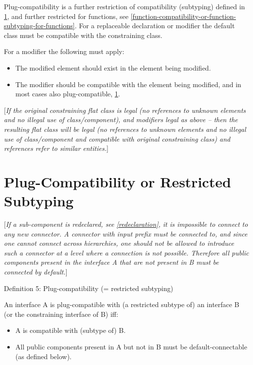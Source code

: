 \documentclass[10pt,a4paper]{report}
\def\doublelabel#1{\label{#1}\hypertarget{#1}{}}
\begin{document}
Plug-compatibility is a further restriction of compatibility (subtyping)
defined in \ref{plug-compatibility-or-restricted-subtyping}, and further restricted for functions, see
\ref{function-compatibility-or-function-subtyping-for-functions}. For a replaceable declaration or modifier the default class
must be compatible with the constraining class.

For a modifier the following must apply:

\begin{itemize}
\item
  The modified element should exist in the element being modified.
\end{itemize}

\begin{itemize}
\item
  The modifier should be compatible with the element being modified, and
  in most cases also plug-compatible, \ref{plug-compatibility-or-restricted-subtyping}.
\end{itemize}

{[}\emph{If the original constraining flat class is legal (no references
to unknown elements and no illegal use of class/component), and
modifiers legal as above -- then the resulting flat class will be legal
(no references to unknown elements and no illegal use of class/component
and compatible with original constraining class) and references refer to
similar entities.}{]}

\section{Plug-Compatibility or Restricted Subtyping}\doublelabel{plug-compatibility-or-restricted-subtyping}

{[}\emph{If a sub-component is redeclared, see \ref{redeclaration}, it is
impossible to connect to any new connector. A connector with input
prefix must be connected to, and since one cannot connect across
hierarchies, one should not be allowed to introduce such a connector at
a level where a connection is not possible. Therefore all public
components present in the interface A that are not present in B must be
connected by default.}{]}

Definition 5: Plug-compatibility (= restricted subtyping)

An interface A is plug-compatible with (a restricted subtype of) an
interface B (or the constraining interface of B) iff:

\begin{itemize}
\item
  A is compatible with (subtype of) B.
\item
  All public components present in A but not in B must be
  default-connectable (as defined below).
\end{itemize}
\end{document}
